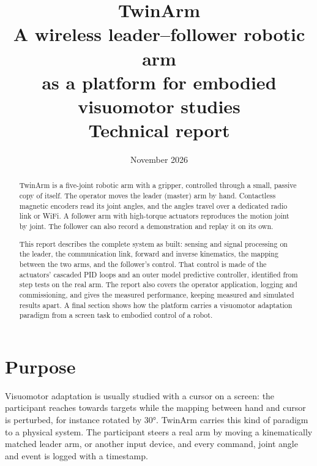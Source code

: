 \documentclass[11pt,a4paper]{article}
\title{\textbf{TwinArm}\\[4pt]
\large A wireless leader--follower robotic arm\\ as a platform for embodied visuomotor studies\\[10pt]
\normalsize Technical report}
\date{November 2026}
\begin{document}
\maketitle

\begin{abstract}
\noindent TwinArm is a five-joint robotic arm with a gripper, controlled through a small, passive copy of
itself. The operator moves the leader (master) arm by hand. Contactless magnetic encoders read its joint angles,
and the angles travel over a dedicated radio link or WiFi. A follower arm with high-torque actuators reproduces
the motion joint by joint. The follower can also record a demonstration and replay it on its own.

This report describes the complete system as built: sensing and signal processing on the leader, the
communication link, forward and inverse kinematics, the mapping between the two arms, and the follower's
control. That control is made of the actuators' cascaded PID loops and an outer model predictive controller,
identified from step tests on the real arm. The report also covers the operator application, logging and
commissioning, and gives the measured performance, keeping measured and simulated results apart. A final
section shows how the platform carries a visuomotor adaptation paradigm from a screen task to embodied control
of a robot.
\end{abstract}

\tableofcontents
\bigskip

\section{Purpose}

Visuomotor adaptation is usually studied with a cursor on a screen: the participant reaches towards targets
while the mapping between hand and cursor is perturbed, for instance rotated by \ang{30}. TwinArm carries this
kind of paradigm to a physical system. The participant steers a real arm by moving a kinematically matched
leader arm, or another input device, and every command, joint angle and event is logged with a timestamp.
\end{document}
